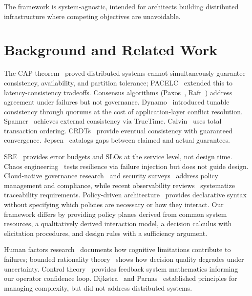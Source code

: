 \documentclass[conference]{IEEEtran}
\begin{document}
The framework is system-agnostic, intended for architects building distributed infrastructure where competing objectives are unavoidable.

\section{Background and Related Work}

The CAP theorem~\cite{brewer2000cap,gilbert2002brewer} proved distributed systems cannot simultaneously guarantee consistency, availability, and partition tolerance; PACELC~\cite{pacelc} extended this to latency-consistency tradeoffs. Consensus algorithms (Paxos~\cite{lamport2001paxos}, Raft~\cite{raft}) address agreement under failures but not governance. Dynamo~\cite{dynamo} introduced tunable consistency through quorums at the cost of application-layer conflict resolution. Spanner~\cite{spanner} achieves external consistency via TrueTime. Calvin~\cite{calvin} uses total transaction ordering. CRDTs~\cite{crdt} provide eventual consistency with guaranteed convergence. Jepsen~\cite{jepsen} catalogs gaps between claimed and actual guarantees.

SRE~\cite{sre} provides error budgets and SLOs at the service level, not design time. Chaos engineering~\cite{chaos} tests resilience via failure injection but does not guide design. Cloud-native governance research~\cite{pourmajidi2025governance,cncf2023policy,cncf2023governance} and security surveys~\cite{theodoropoulos2023cloud} address policy management and compliance, while recent observability reviews~\cite{observability2026} systematize traceability requirements. Policy-driven architecture~\cite{policyarch} provides declarative syntax without specifying which policies are necessary or how they interact. Our framework differs by providing policy planes derived from common system resources, a qualitatively derived interaction model, a decision calculus with elicitation procedures, and design rules with a sufficiency argument.

Human factors research~\cite{humanfactors,leveson} documents how cognitive limitations contribute to failures; bounded rationality theory~\cite{simon} shows how decision quality degrades under uncertainty. Control theory~\cite{controltheory} provides feedback system mathematics informing our operator confidence loop. Dijkstra~\cite{dijkstra1972humble} and Parnas~\cite{parnas1972criteria} established principles for managing complexity, but did not address distributed systems.
\end{document}
